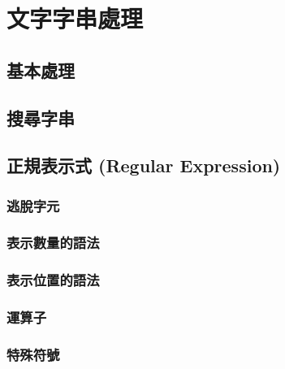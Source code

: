 \documentclass[
]{book}
\begin{document}
\hypertarget{ux6587ux5b57ux5b57ux4e32ux8655ux7406}{%
\section{文字字串處理}\label{ux6587ux5b57ux5b57ux4e32ux8655ux7406}}

\hypertarget{ux57faux672cux8655ux7406}{%
\subsection{基本處理}\label{ux57faux672cux8655ux7406}}

\hypertarget{ux641cux5c0bux5b57ux4e32}{%
\subsection{搜尋字串}\label{ux641cux5c0bux5b57ux4e32}}

\hypertarget{ux6b63ux898fux8868ux793aux5f0f-regular-expression}{%
\subsection{正規表示式 (Regular Expression)}\label{ux6b63ux898fux8868ux793aux5f0f-regular-expression}}

\hypertarget{ux9003ux812bux5b57ux5143}{%
\subsubsection{逃脫字元}\label{ux9003ux812bux5b57ux5143}}

\hypertarget{ux8868ux793aux6578ux91cfux7684ux8a9eux6cd5}{%
\subsubsection{表示數量的語法}\label{ux8868ux793aux6578ux91cfux7684ux8a9eux6cd5}}

\hypertarget{ux8868ux793aux4f4dux7f6eux7684ux8a9eux6cd5}{%
\subsubsection{表示位置的語法}\label{ux8868ux793aux4f4dux7f6eux7684ux8a9eux6cd5}}

\hypertarget{ux904bux7b97ux5b50}{%
\subsubsection{運算子}\label{ux904bux7b97ux5b50}}

\hypertarget{ux7279ux6b8aux7b26ux865f}{%
\subsubsection{特殊符號}\label{ux7279ux6b8aux7b26ux865f}}
\end{document}

